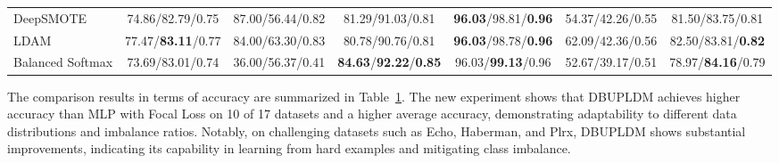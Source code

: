 \documentclass[a4paper]{cas-sc}
\begin{document}
\begin{table}[htbp]
{\begin{tabular}{lcccccc}
    DeepSMOTE        & {\color{red}74.86}/{\color{red}82.79}/{\color{red}0.75} & {\color{red}87.00}/{\color{red}56.44}/{\color{red}0.82} & {\color{red}81.29}/{\color{red}91.03}/{\color{red}0.81} & \textbf{\color{red}96.03}/{\color{red}98.81}/\textbf{\color{red}0.96} & {\color{red}54.37}/{\color{red}42.26}/{\color{red}0.55} & {\color{red}81.50}/{\color{red}83.75}/{\color{red}0.81} \\
    LDAM             & {\color{red}77.47}/\textbf{\color{red}83.11}/{\color{red}0.77} & {\color{red}84.00}/{\color{red}63.30}/{\color{red}0.83} & {\color{red}80.78}/{\color{red}90.76}/{\color{red}0.81} & \textbf{\color{red}96.03}/{\color{red}98.78}/\textbf{\color{red}0.96} & {\color{red}62.09}/{\color{red}42.36}/{\color{red}0.56} & {\color{red}82.50}/{\color{red}83.81}/\textbf{\color{red}0.82} \\
    Balanced Softmax & {\color{red}73.69}/{\color{red}83.01}/{\color{red}0.74} & {\color{red}36.00}/{\color{red}56.37}/{\color{red}0.41} & \textbf{\color{red}84.63}/\textbf{\color{red}92.22}/\textbf{\color{red}0.85} & {\color{red}96.03}/\textbf{\color{red}99.13}/{\color{red}0.96} & {\color{red}52.67}/{\color{red}39.17}/{\color{red}0.51} & {\color{red}78.97}/\textbf{\color{red}84.16}/{\color{red}0.79} \\
    \bottomrule
    \end{tabular}
  }
  \label{tab:performance_comparison}
\end{table}



{\color{blue}The comparison results in terms of accuracy are summarized in Table~\ref{tab:performance_comparison}. {\color{red}The new experiment shows that DBUPLDM achieves higher accuracy than MLP with Focal Loss on 10 of 17 datasets and a higher average accuracy, demonstrating adaptability to different data distributions and imbalance ratios. Notably, on challenging datasets such as Echo, Haberman, and Plrx, DBUPLDM shows substantial improvements, indicating its capability in learning from hard examples and mitigating class imbalance.}}
\end{document}
